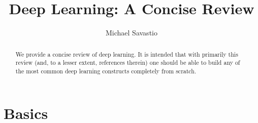 \documentclass{article}
\title{Deep Learning: A Concise Review}
\author{Michael Savastio}
\date{}
\begin{document}
\maketitle
\begin{abstract}
    We provide a concise review of deep learning.  It is intended that with primarily this review (and, to a lesser extent, references therein) one should be
    able to build any of the most common deep learning constructs completely from scratch.
\end{abstract}

\section{Basics}




\end{document}
